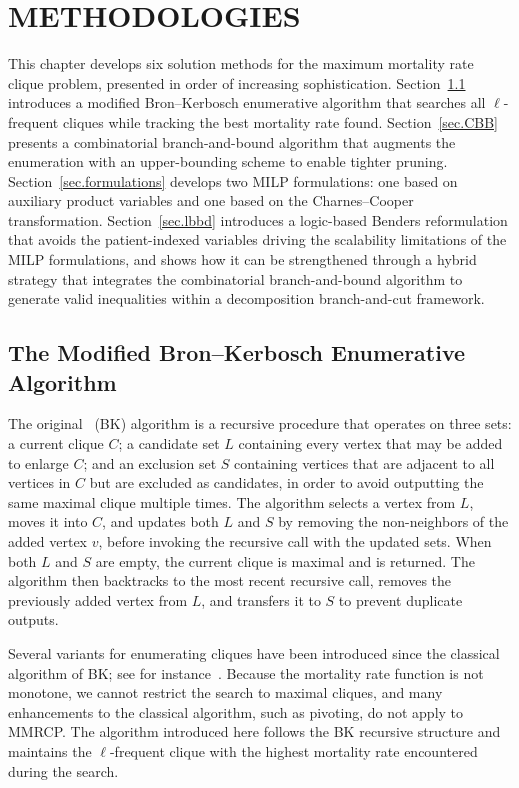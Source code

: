 \begingroup
\clearpage
\let\clearpage\relax
\vspace*{-16pt}
\chapter[METHODOLOGIES]{METHODOLOGIES}\label{sec.methods}
\endgroup

This chapter develops six solution methods for the maximum mortality
rate clique problem, presented in order of increasing
sophistication. Section~\ref{sec.MBK} introduces a modified
Bron--Kerbosch enumerative algorithm that searches all $\ell$-frequent
cliques while tracking the best mortality rate found.
Section~\ref{sec.CBB} presents a combinatorial branch-and-bound
algorithm that augments the enumeration with an upper-bounding
scheme to enable tighter pruning. Section~\ref{sec.formulations}
develops two MILP formulations: one based on auxiliary product
variables and one based on the Charnes--Cooper transformation.
Section~\ref{sec.lbbd} introduces a logic-based Benders reformulation
that avoids the patient-indexed variables driving the scalability
limitations of the MILP formulations, and shows how it can be
strengthened through a hybrid strategy that integrates the
combinatorial branch-and-bound algorithm to generate valid
inequalities within a decomposition branch-and-cut framework.

\section{The Modified Bron--Kerbosch Enumerative
Algorithm}\label{sec.MBK}

The original~\cite{BronKerbosch73} (BK) algorithm is a recursive procedure
that operates on three sets: a current clique $C$; a candidate set
$L$ containing every vertex that may be added to enlarge $C$; and an
exclusion set $S$ containing vertices that are adjacent to all
vertices in $C$ but are excluded as candidates, in order to avoid
outputting the same maximal clique multiple times. The algorithm
selects a vertex from $L$, moves it into $C$, and updates both $L$
and $S$ by removing the non-neighbors of the added vertex $v$, before
invoking the recursive call with the updated sets. When both $L$ and
$S$ are empty, the current clique is maximal and is returned. The
algorithm then backtracks to the most recent recursive call, removes
the previously added vertex from $L$, and transfers it to $S$ to
prevent duplicate outputs.

Several variants for enumerating cliques have been introduced since
the classical algorithm of BK; see for
instance~\citep{chiba1985, TOMITA2006, CAZALS2008TCS, Eppstein13,
san2018efficiently}. Because the mortality rate function is not
monotone, we cannot restrict the search to maximal cliques, and many
enhancements to the classical algorithm, such as pivoting, do not
apply to MMRCP.  The algorithm introduced here follows the BK recursive structure and maintains the $\ell$-frequent clique with the highest mortality rate encountered during the search.

